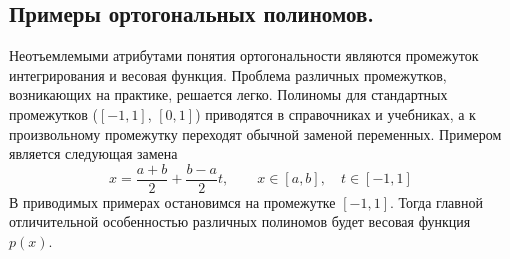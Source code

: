 \subsection{Примеры ортогональных полиномов.}
Неотъемлемыми атрибутами понятия ортогональности являются промежуток интегрирования и весовая функция. Проблема различных
промежутков, возникающих на практике, решается легко. Полиномы для стандартных промежутков ($[-1, 1]$, $[0, 1]$)
приводятся в справочниках и учебниках, а к произвольному промежутку переходят обычной заменой переменных. Примером
является следующая замена
\begin{equation*}
    x = \frac{a + b}{2} + \frac{b - a}{2}t, \qquad x \in [a, b], \quad t \in [-1, 1]
\end{equation*}
В приводимых примерах остановимся на промежутке $[-1, 1]$. Тогда главной отличительной особенностью различных полиномов
будет весовая функция $p(x)$.
